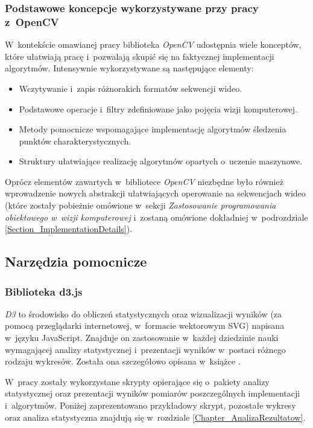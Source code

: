       \subsubsection{Podstawowe koncepcje wykorzystywane przy pracy z~OpenCV}
      W~kontekście omawianej pracy biblioteka \textit{OpenCV} udostępnia wiele konceptów, które ułatwiają pracę i~pozwalają skupić się na faktycznej implementacji algorytmów. Intensywnie wykorzystywane są następujące elementy:
      \begin{itemize}
        \item Wczytywanie i~zapis różnorakich formatów sekwencji wideo.
        \item Podstawowe operacje i~filtry zdefiniowane jako pojęcia wizji komputerowej.
        \item Metody pomocnicze wspomagające implementację algorytmów śledzenia punktów charakterystycznych.
        \item Struktury ułatwiające realizację algorytmów opartych o~uczenie maszynowe.
      \end{itemize}

      Oprócz elementów zawartych w~bibliotece \textit{OpenCV} niezbędne było również wprowadzenie nowych abstrakcji ułatwiających operowanie na sekwencjach wideo (które zostały pobieżnie omówione w~sekcji \textit{Zastosowanie programowania obiektowego w~wizji komputerowej} i~zostaną omówione dokładniej w~podrozdziale \ref{Section_ImplementationDetails}).

    \subsection{Narzędzia pomocnicze}\label{Subsection_PomocniczeTechnologie}

      \subsubsection{Biblioteka d3.js}
      \textit{D3} to środowisko do obliczeń statystycznych oraz wizualizacji wyników (za pomocą przeglądarki internetowej, w~formacie wektorowym SVG) napisana w~języku JavaScript. Znajduje on zastosowanie w~każdej dziedzinie nauki wymagającej analizy statystycznej i~prezentacji wyników w~postaci różnego rodzaju wykresów. Została ona szczegółowo opisana w~książce \cite{D3Book}.

      W~pracy zostały wykorzystane skrypty opierające się o~pakiety analizy statystycznej oraz prezentacji wyników pomiarów poszczególnych implementacji i~algorytmów. Poniżej zaprezentowano przykładowy skrypt, pozostałe wykresy oraz analiza statystyczna znajdują się w~rozdziale \ref{Chapter_AnalizaRezultatow}.


